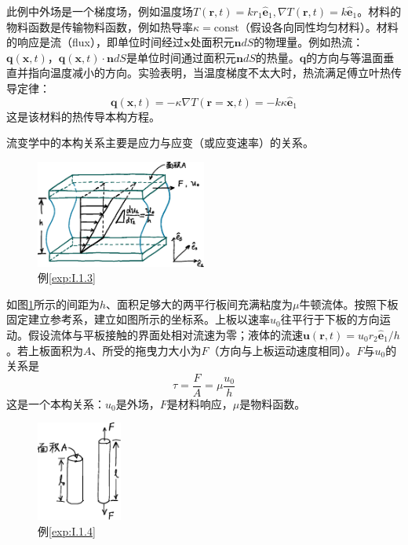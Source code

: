 \documentclass[main.tex]{subfiles}
\begin{document}
\begin{example}\label{exp:I.1.2}
    此例中外场是一个梯度场，例如温度场$T\left(\mathbf{r},t\right)=kr_1\mathbf{\hat{e}}_1,\nabla T\left(\mathbf{r},t\right)=k\mathbf{\hat{e}}_1$。材料的物料函数是传输物料函数，例如热导率$\kappa=\text{const}$（假设各向同性均匀材料）。材料的响应是流（flux），即单位时间经过$\mathbf{x}$处面积元$\mathbf{n}dS$的物理量。例如热流：$\mathbf{q}\left(\mathbf{x},t\right)$，$\mathbf{q}\left(\mathbf{x},t\right)\cdot\mathbf{n}dS$是单位时间通过面积元$\mathbf{n}dS$的热量。$\mathbf{q}$的方向与等温面垂直并指向温度减小的方向。实验表明，当温度梯度不太大时，热流满足傅立叶热传导定律\cite[\S1.1.3.1,p.~9]{钟理化工原理上册2008}：
    \[
        \mathbf{q}\left(\mathbf{x},t\right)=-\kappa\nabla T\left(\mathbf{r}=\mathbf{x},t\right)=-k\kappa\mathbf{\hat{e}}_1
    \]
    这是该材料的热传导本构方程。
\end{example}

流变学中的本构关系主要是应力与应变（或应变速率）的关系。

\begin{figure}[h]
    \centering
    \includegraphics[width=0.5\textwidth]{images/I.1.3.eps}
    \caption{例\ref{exp:I.1.3}}
    \label{fig:I.1.3}
\end{figure}

\begin{example}[简单剪切下的牛顿流体本构关系]\label{exp:I.1.3}
    如图\ref{fig:I.1.3}所示的间距为$h$、面积足够大的两平行板间充满粘度为$\mu$牛顿流体。按照下板固定建立参考系，建立如图所示的坐标系。上板以速率$u_0$往平行于下板的方向运动。假设流体与平板接触的界面处相对流速为零；液体的流速$\mathbf{u}\left(\mathbf{r},t\right)=u_0r_2\mathbf{\hat{e}}_1/h$。若上板面积为$A$、所受的拖曳力大小为$F$（方向与上板运动速度相同）。$F$与$u_0$的关系是
    \[
        \tau=\frac{F}{A}=\mu\frac{u_0}{h}
    \]
    这是一个本构关系：$u_0$是外场，$F$是材料响应，$\mu$是物料函数。
\end{example}

\begin{figure}[h]
    \centering
    \includegraphics[width=0.25\textwidth]{images/I.1.4.eps}
    \caption{例\ref{exp:I.1.4}}
    \label{fig:I.1.4}
\end{figure}
\end{document}
